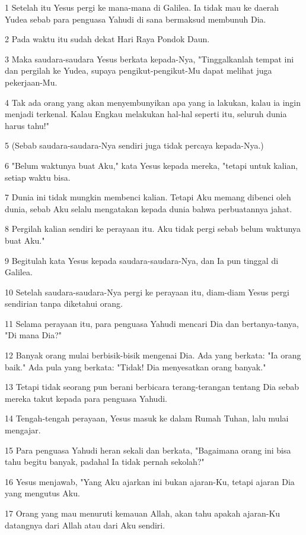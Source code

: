 \par 1 Setelah itu Yesus pergi ke mana-mana di Galilea. Ia tidak mau ke daerah Yudea sebab para penguasa Yahudi di sana bermaksud membunuh Dia.
\par 2 Pada waktu itu sudah dekat Hari Raya Pondok Daun.
\par 3 Maka saudara-saudara Yesus berkata kepada-Nya, "Tinggalkanlah tempat ini dan pergilah ke Yudea, supaya pengikut-pengikut-Mu dapat melihat juga pekerjaan-Mu.
\par 4 Tak ada orang yang akan menyembunyikan apa yang ia lakukan, kalau ia ingin menjadi terkenal. Kalau Engkau melakukan hal-hal seperti itu, seluruh dunia harus tahu!"
\par 5 (Sebab saudara-saudara-Nya sendiri juga tidak percaya kepada-Nya.)
\par 6 "Belum waktunya buat Aku," kata Yesus kepada mereka, "tetapi untuk kalian, setiap waktu bisa.
\par 7 Dunia ini tidak mungkin membenci kalian. Tetapi Aku memang dibenci oleh dunia, sebab Aku selalu mengatakan kepada dunia bahwa perbuatannya jahat.
\par 8 Pergilah kalian sendiri ke perayaan itu. Aku tidak pergi sebab belum waktunya buat Aku."
\par 9 Begitulah kata Yesus kepada saudara-saudara-Nya, dan Ia pun tinggal di Galilea.
\par 10 Setelah saudara-saudara-Nya pergi ke perayaan itu, diam-diam Yesus pergi sendirian tanpa diketahui orang.
\par 11 Selama perayaan itu, para penguasa Yahudi mencari Dia dan bertanya-tanya, "Di mana Dia?"
\par 12 Banyak orang mulai berbisik-bisik mengenai Dia. Ada yang berkata: "Ia orang baik." Ada pula yang berkata: "Tidak! Dia menyesatkan orang banyak."
\par 13 Tetapi tidak seorang pun berani berbicara terang-terangan tentang Dia sebab mereka takut kepada para penguasa Yahudi.
\par 14 Tengah-tengah perayaan, Yesus masuk ke dalam Rumah Tuhan, lalu mulai mengajar.
\par 15 Para penguasa Yahudi heran sekali dan berkata, "Bagaimana orang ini bisa tahu begitu banyak, padahal Ia tidak pernah sekolah?"
\par 16 Yesus menjawab, "Yang Aku ajarkan ini bukan ajaran-Ku, tetapi ajaran Dia yang mengutus Aku.
\par 17 Orang yang mau menuruti kemauan Allah, akan tahu apakah ajaran-Ku datangnya dari Allah atau dari Aku sendiri.
